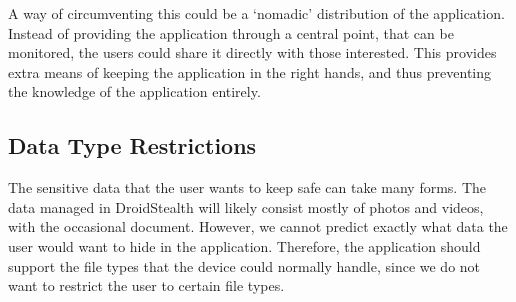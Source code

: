 A way of circumventing this could be a `nomadic' distribution of the application.
Instead of providing the application through a central point, that can be monitored, the users could share it directly with those interested.
This provides extra means of keeping the application in the right hands, and thus preventing the knowledge of the application entirely.  

\subsection{Data Type Restrictions}
The sensitive data that the user wants to keep safe can take many forms.
The data managed in DroidStealth will likely consist mostly of photos and videos, with the occasional document. 
However, we cannot predict exactly what data the user would want to hide in the application.
Therefore, the application should support the file types that the device could normally handle, since we do not want to restrict the user to certain file types.
